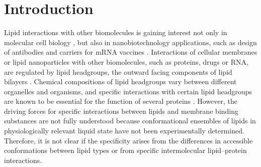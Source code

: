 \documentclass[journal=jpcbfk,manuscript=article]{achemso}
\begin{document}
\maketitle


\section{Introduction}

Lipid interactions with other biomolecules is gaining interest
not only in molecular cell biology \cite{harayama18}, but also in
nanobiotechnology applications, such as design of antibodies \cite{vigant15}
and carriers for mRNA vaccines \cite{pardi18,schoenmaker21}.
Interactions of cellular membranes or lipid nanoparticles with other biomolecules,
such as proteins, drugs or RNA, are regulated by lipid headgroups,
the outward facing components of lipid bilayers \cite{harayama18,vanmeer08}.
Chemical compositions of lipid headgroups vary between different
organelles and organisms, and specific interactions with certain lipid headgroups
are known to be essential for the function of several proteins \cite{harayama18,vanmeer08}.
However, the driving forces for specific interactions between lipids and membrane binding
substances are not fully understood because conformational ensembles of lipids in
physiologically relevant liquid state have not been experimentally determined.
Therefore, it is not clear if the specificity arises from the
differences in accessible conformations between lipid types or
from specific intermolecular lipid--protein interactions.
\end{document}
